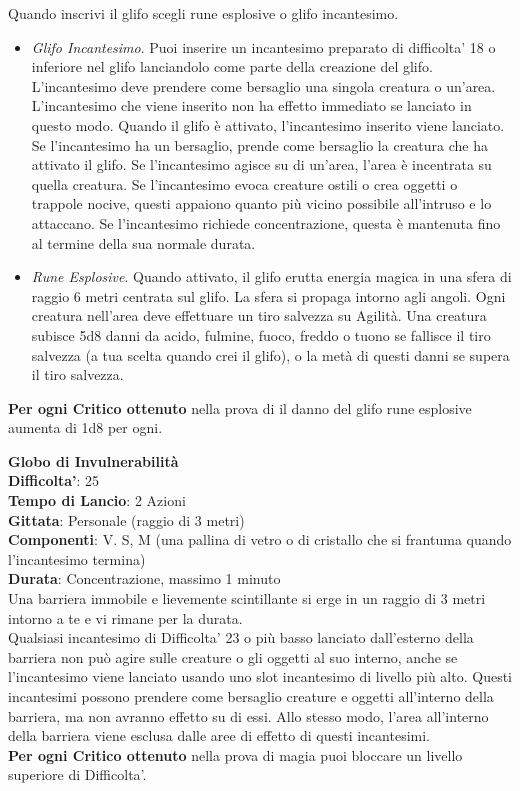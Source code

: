 \begin{multicols}{2}
Quando inscrivi il glifo scegli rune esplosive o glifo incantesimo.
\medskip
\begin{itemize}
\item
\textit{Glifo Incantesimo}. Puoi inserire un incantesimo preparato di difficolta' 18 o inferiore nel glifo lanciandolo come parte della creazione del glifo. L’incantesimo deve prendere come bersaglio una singola creatura o un’area. L’incantesimo che viene inserito non ha effetto immediato se lanciato in questo modo. Quando il glifo è attivato, l’incantesimo inserito viene lanciato. Se l’incantesimo ha un bersaglio, prende come bersaglio la creatura che ha attivato il glifo. Se l’incantesimo agisce su di un’area, l’area è incentrata su quella creatura. Se l’incantesimo evoca creature ostili o crea oggetti o trappole nocive, questi appaiono quanto più vicino possibile all’intruso e lo attaccano. Se l’incantesimo richiede concentrazione, questa è mantenuta fino al termine della sua normale durata.
\item
\textit{Rune Esplosive}. Quando attivato, il glifo erutta energia magica in una sfera di raggio 6 metri centrata sul glifo. La sfera si propaga intorno agli angoli. Ogni creatura nell’area deve effettuare un tiro salvezza su Agilità. Una creatura subisce 5d8 danni da acido, fulmine, fuoco, freddo o tuono se fallisce il tiro salvezza (a tua scelta quando crei il glifo), o la metà di questi danni se supera il tiro salvezza.
\end{itemize}
\medskip
\textbf{Per ogni Critico ottenuto} nella prova di il danno del glifo rune esplosive aumenta di 1d8 per ogni.

\medskip\textbf{Globo di Invulnerabilità}\\
\textbf{Difficolta'}: 25\\
\textbf{Tempo di Lancio}: 2 Azioni\\
\textbf{Gittata}: Personale (raggio di 3 metri)\\
\textbf{Componenti}: V. S, M (una pallina di vetro o di cristallo che si frantuma quando l’incantesimo termina) \\
\textbf{Durata}: Concentrazione, massimo 1 minuto\\
Una barriera immobile e lievemente scintillante si erge in un raggio di 3 metri intorno a te e vi rimane per la durata.\\
Qualsiasi incantesimo di Difficolta' 23 o più basso lanciato dall’esterno della barriera non può agire sulle creature o gli oggetti al suo interno, anche se l’incantesimo viene lanciato usando uno slot incantesimo di livello più alto. Questi incantesimi possono prendere come bersaglio creature e oggetti all’interno della barriera, ma non avranno effetto su di essi. Allo stesso modo, l’area all’interno della barriera viene esclusa dalle aree di effetto di questi incantesimi.\\
\textbf{Per ogni Critico ottenuto} nella prova di magia puoi bloccare un livello superiore di Difficolta'.


\end{multicols}
